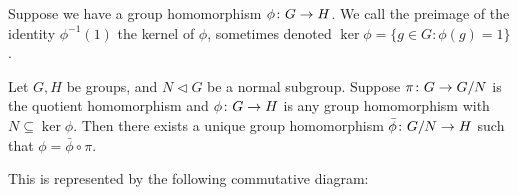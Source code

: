 \begin{definition}
    Suppose we have a group homomorphism \(\phi\colon G\to H\).
    We call the preimage of the identity \(\phi^{-1}(1)\)
    the kernel of \(\phi\),
    sometimes denoted \(\ker\phi = \{g \in G : \phi(g) = 1\}\).
\end{definition}

\begin{theorem}\label{thm:univ-prop-quotient-group}
    Let \(G,H\) be groups,
    and \(N \lhd G\) be a normal subgroup.
    Suppose \(\pi\colon G\to G/N\) is the quotient homomorphism
    and \(\phi\colon G\to H\) is any group homomorphism
    with \(N \subseteq \ker\phi\).
    Then there exists a unique group homomorphism
    \(\bar{\phi}\colon G/N\to H\) such that \(\phi = \bar{\phi}\circ\pi\).

    This is represented by the following commutative diagram:
    \begin{center}
    \end{center}
\end{theorem}

